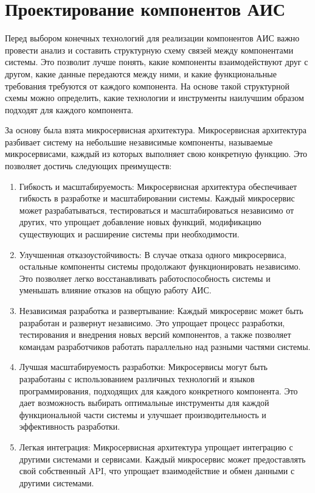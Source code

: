 \section{Проектирование компонентов АИС}
Перед выбором конечных технологий для реализации компонентов АИС важно провести анализ
и составить структурную схему связей между компонентами системы.
Это позволит лучше понять, какие компоненты взаимодействуют друг с другом,
какие данные передаются между ними, и какие функциональные требования требуются от каждого компонента.
На основе такой структурной схемы можно определить,
какие технологии и инструменты наилучшим образом подходят для каждого компонента.

За основу была взята микросервисная архитектура.
Микросервисная архитектура разбивает систему на небольшие независимые компоненты,
называемые микросервисами, каждый из которых выполняет свою конкретную функцию.
Это позволяет достичь следующих преимуществ:

\begin{enumerate}
  \item Гибкость и масштабируемость: Микросервисная архитектура обеспечивает гибкость в разработке и масштабировании системы.
  Каждый микросервис может разрабатываться, тестироваться и масштабироваться независимо от других,
  что упрощает добавление новых функций, модификацию существующих и расширение системы при необходимости.
  \item Улучшенная отказоустойчивость: В случае отказа одного микросервиса,
  остальные компоненты системы продолжают функционировать независимо.
  Это позволяет легко восстанавливать работоспособность системы и
  уменьшать влияние отказов на общую работу АИС.
  \item Независимая разработка и развертывание: Каждый микросервис может быть разработан
  и развернут независимо. Это упрощает процесс разработки, тестирования и
  внедрения новых версий компонентов, а также позволяет командам разработчиков
  работать параллельно над разными частями системы.
  \item Лучшая масштабируемость разработки: Микросервисы могут быть разработаны с
  использованием различных технологий и языков программирования, подходящих для каждого
  конкретного компонента. Это дает возможность выбирать оптимальные инструменты для
  каждой функциональной части системы и улучшает производительность и эффективность разработки.
  \item Легкая интеграция: Микросервисная архитектура упрощает интеграцию с другими
  системами и сервисами. Каждый микросервис может предоставлять свой собственный API,
  что упрощает взаимодействие и обмен данными с другими системами.
\end{enumerate}


